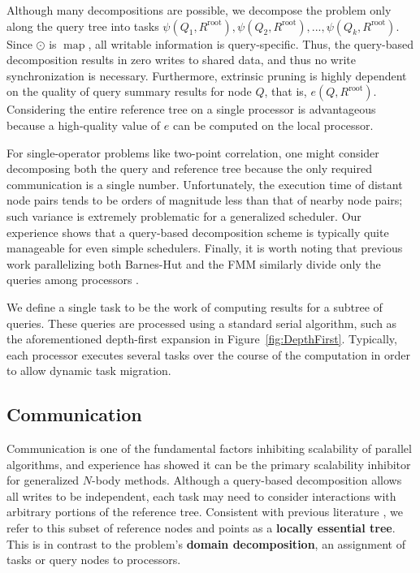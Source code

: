 \documentclass[twoside,leqno,twocolumn]{article}
\DeclareMathOperator*{\map}{map}
\newcommand{\fig}[1]{Figure~\ref{fig:#1}}
\newcommand{\gnp}{\psi}
\newcommand{\defterm}[1]{{\bf #1}}
\newcommand{\kdroot}[1]{#1^{\text{root}}}
\newcommand{\lettermu}{e}
\newcommand{\inmu}{e}
\begin{document}
Although many decompositions are possible, we decompose the problem only along the query tree into tasks $\gnp(Q_1, \kdroot{R}), \gnp(Q_2, \kdroot{R}), ..., \gnp(Q_k, \kdroot{R})$.
Since $\odot$ is $\map$, all writable information is query-specific.
Thus, the query-based decomposition results in zero writes to shared data, and thus no write synchronization is necessary.
Furthermore, extrinsic pruning is highly dependent on the quality of query summary results for node $Q$, that is, $\inmu(Q, \kdroot{R})$.
Considering the entire reference tree on a single processor is advantageous because a high-quality value of $\lettermu$ can be computed on the local processor.

For single-operator problems like two-point correlation, one might consider decomposing both the query and reference tree because the only required communication is a single number.
Unfortunately, the execution time of distant node pairs tends to be orders of magnitude less than that of nearby node pairs; such variance is extremely problematic for a generalized scheduler.
Our experience shows that a query-based decomposition scheme is typically quite manageable for even simple schedulers.
Finally, it is worth noting that previous work parallelizing both Barnes-Hut and the FMM similarly divide only the queries among processors \cite{salmon_thesis, singh_thesis, liu94experiences}.

We define a single task to be the work of computing results for a subtree of queries.
These queries are processed using a standard serial algorithm, such as the aforementioned depth-first expansion in \fig{DepthFirst}.
Typically, each processor executes several tasks over the course of the computation in order to allow dynamic task migration.

\subsection{Communication}

Communication is one of the fundamental factors inhibiting scalability of parallel algorithms, and experience has showed it can be the primary scalability inhibitor for generalized $N$-body methods.
Although a query-based decomposition allows all writes to be independent, each task may need to consider interactions with arbitrary portions of the reference tree.
Consistent with previous literature \cite{salmon_thesis, singh_thesis}, we refer to this subset of reference nodes and points as a \defterm{locally essential tree}.
This is in contrast to the problem's \defterm{domain decomposition}, an assignment of tasks or query nodes to processors.
\end{document}
